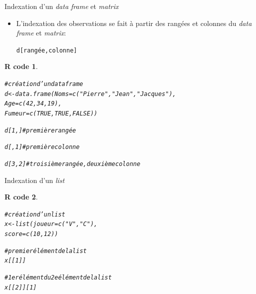 \documentclass[11pt]{beamer}\usepackage[]{graphicx}\usepackage[]{color}
\makeatletter
\newcommand{\hlnum}[1]{\textcolor[rgb]{0.063,0.58,0.627}{#1}}%
\newcommand{\hlstr}[1]{\textcolor[rgb]{0.063,0.58,0.627}{#1}}%
\newcommand{\hlcom}[1]{\textcolor[rgb]{0.588,0.588,0.588}{#1}}%
\newcommand{\hlstd}[1]{\textcolor[rgb]{0.196,0.196,0.196}{#1}}%
\newcommand{\hlkwb}[1]{\textcolor[rgb]{0.627,0,0.314}{#1}}%
\newcommand{\hlkwc}[1]{\textcolor[rgb]{0,0.631,0.314}{#1}}%
\newcommand{\hlkwd}[1]{\textcolor[rgb]{0.78,0.227,0.412}{#1}}%
\newenvironment{kframe}{%
 \def\at@end@of@kframe{}%
 \ifinner\ifhmode%
  \def\at@end@of@kframe{\end{minipage}}%
  \begin{minipage}{\columnwidth}%
 \fi\fi%
 \def\FrameCommand##1{\hskip\@totalleftmargin \hskip-\fboxsep
 \colorbox{shadecolor}{##1}\hskip-\fboxsep
     \hskip-\linewidth \hskip-\@totalleftmargin \hskip\columnwidth}%
 \MakeFramed {\advance\hsize-\width
   \@totalleftmargin\z@ \linewidth\hsize
   \@setminipage}}%
 {\par\unskip\endMakeFramed%
 \at@end@of@kframe}
\newenvironment{knitrout}{}{} %
\newtheorem{rcode}{R code}[section]
\newcommand{\code}[1]{\texttt{#1}}
\makeatother
\begin{document}
\begin{frame}[fragile]{Indexation d'un \textit{data frame} et \textit{matrix}}

\begin{itemize}
  \setlength\itemsep{2em}
\item L'indexation des observations se fait à partir des rangées et colonnes du \textit{data frame} et \textit{matrix}:
\begin{center}
\code{d[rangée,colonne]}
\end{center}

\end{itemize}
\pause 
\begin{knitrout}\small
{}\color{fgcolor}\begin{kframe}
\begin{rcode}\label{unnamed-chunk-26}\begin{alltt}
\hlcom{# création d'un data frame}
\hlstd{d} \hlkwb{<-} \hlkwd{data.frame}\hlstd{(}\hlkwc{Noms} \hlstd{=} \hlkwd{c}\hlstd{(}\hlstr{"Pierre"}\hlstd{,} \hlstr{"Jean"}\hlstd{,} \hlstr{"Jacques"}\hlstd{),}
\hlkwc{Age} \hlstd{=} \hlkwd{c}\hlstd{(}\hlnum{42}\hlstd{,} \hlnum{34}\hlstd{,} \hlnum{19}\hlstd{),}
\hlkwc{Fumeur} \hlstd{=} \hlkwd{c}\hlstd{(}\hlnum{TRUE}\hlstd{,} \hlnum{TRUE}\hlstd{,} \hlnum{FALSE}\hlstd{))}

\hlstd{d[}\hlnum{1}\hlstd{, ]} \hlcom{# première rangée}

\hlstd{d[ ,}\hlnum{1}\hlstd{]} \hlcom{# première colonne }

\hlstd{d[}\hlnum{3}\hlstd{,}\hlnum{2}\hlstd{]} \hlcom{# troisième rangée, deuxième colonne}
\end{alltt}
\end{rcode}\end{kframe}
\end{knitrout}
\end{frame}




\begin{frame}[fragile]{Indexation d'un \textit{list}}

\begin{knitrout}
\color{fgcolor}\begin{kframe}
\begin{rcode}\label{unnamed-chunk-27}\begin{alltt}
\hlcom{# création d'un list}
\hlstd{x} \hlkwb{<-} \hlkwd{list}\hlstd{(}\hlkwc{joueur} \hlstd{=} \hlkwd{c}\hlstd{(}\hlstr{"V"}\hlstd{,} \hlstr{"C"}\hlstd{),}
                  \hlkwc{score} \hlstd{=} \hlkwd{c}\hlstd{(}\hlnum{10}\hlstd{,} \hlnum{12}\hlstd{))}

\hlcom{# premier élément de la list}
\hlstd{x[[}\hlnum{1}\hlstd{]]}

\hlcom{# 1er élément du 2e élément de la list}
\hlstd{x[[}\hlnum{2}\hlstd{]][}\hlnum{1}\hlstd{]}
\end{alltt}
\end{rcode}\end{kframe}
\end{knitrout}
\end{frame}
\end{document}
